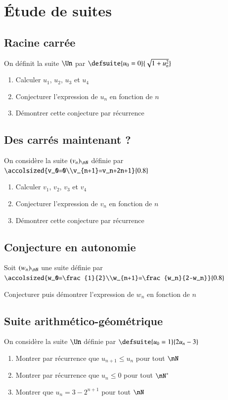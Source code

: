 \documentclass[oneside,12pt]{article}          %
\begin{document}
\section{Étude de suites}


\subsection{Racine carrée}
On définit la suite $\Un$ par $\defsuite{u_0=0}{\sqrt{1+u_n^2}}$ 
\begin{enumerate}
    \item Calculer $u_1$, $u_2$, $u_3$ et $u_4$
    \item Conjecturer l'expression de $u_n$ en fonction de $n$
    \item Démontrer cette conjecture par récurrence
\end{enumerate}



\subsection{Des carrés maintenant ?}

On considère la suite $(v_n)_{\nN}$ définie par $\accolsized{v_0=0\\v_{n+1}=v_n+2n+1}{0.8}$
\begin{enumerate}
    \item Calculer $v_1$, $v_2$, $v_3$ et $v_4$
    \item Conjecturer l'expression de $v_n$ en fonction de $n$
    \item Démontrer cette conjecture par récurrence
\end{enumerate}



\subsection{Conjecture en autonomie}
Soit $(w_n)_{\nN}$ une suite définie par $\accolsized{w_0=\frac{1}{2}\\w_{n+1}=\frac{w_n}{2-w_n}}{0.8}$

Conjecturer puis démontrer l'expression de $w_n$ en fonction de $n$



\subsection{Suite arithmético-géométrique}
On considère la suite $\Un$ définie par $\defsuite{u_0=1}{2u_n-3}$
\begin{enumerate}
    \item Montrer par récurrence que $u_{n+1}\leq u_n$ pour tout $\nN$
    \item Montrer par récurrence que $u_n\leq0$ pour tout $\nN^*$
    \item Montrer que $u_n=3-2^{n+1}$ pour tout $\nN$
\end{enumerate}
\end{document}
